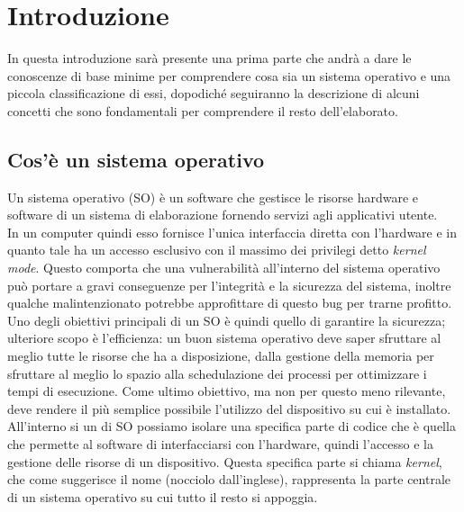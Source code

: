 \chapter{Introduzione}
In questa introduzione sarà presente una prima parte che andrà a dare le conoscenze di base minime per comprendere cosa sia un sistema operativo e una piccola classificazione di essi, dopodiché seguiranno la descrizione di alcuni concetti che sono fondamentali per comprendere il resto dell'elaborato.

\section{Cos'è un sistema operativo}
Un sistema operativo (SO) è un software che gestisce le risorse hardware e software di un sistema di elaborazione fornendo servizi agli applicativi utente.\\
In un computer quindi esso fornisce l'unica interfaccia diretta con l'hardware e in quanto tale ha un accesso esclusivo con il massimo dei privilegi detto \textit{kernel mode}. Questo comporta che una vulnerabilità all'interno del sistema operativo può portare a gravi conseguenze per l'integrità e la sicurezza del sistema, inoltre qualche malintenzionato potrebbe approfittare di questo bug per trarne profitto.
Uno degli obiettivi principali di un SO è quindi quello di garantire la sicurezza; ulteriore scopo è l'efficienza: un buon sistema operativo deve saper sfruttare al meglio tutte le risorse che ha a disposizione, dalla gestione della memoria per sfruttare al meglio lo spazio alla schedulazione dei processi per ottimizzare i tempi di esecuzione. Come ultimo obiettivo, ma non per questo meno rilevante, deve rendere il più semplice possibile l'utilizzo del dispositivo su cui è installato.
All'interno si un di SO possiamo isolare una specifica parte di codice che è quella che permette al software di interfacciarsi con l'hardware, quindi l'accesso e la gestione delle risorse di un dispositivo. Questa specifica parte si chiama \textit{kernel}, che come suggerisce il nome (nocciolo dall'inglese), rappresenta la parte centrale di un sistema operativo su cui tutto il resto si appoggia.
\newpage

